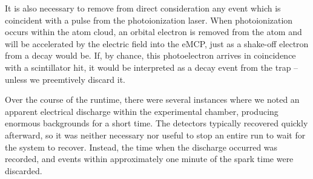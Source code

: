 

It is also necessary to remove from direct consideration any event which is coincident with a pulse from the photoionization laser.  When photoionization occurs within the atom cloud, an orbital electron is removed from the atom and will be accelerated by the electric field into the eMCP, just as a shake-off electron from a decay would be.  If, by chance, this photoelectron arrives in coincidence with a scintillator hit, it would be interpreted as a decay event from the trap -- unless we preemtively discard it.  

Over the course of the runtime, there were several instances where we noted an apparent electrical discharge within the experimental chamber, producing enormous backgrounds for a short time.  The detectors typically recovered quickly afterward, so it was neither necessary nor useful to stop an entire run to wait for the system to recover.  Instead, the time when the discharge occurred was recorded, and events within approximately one minute of the spark time were discarded.  

